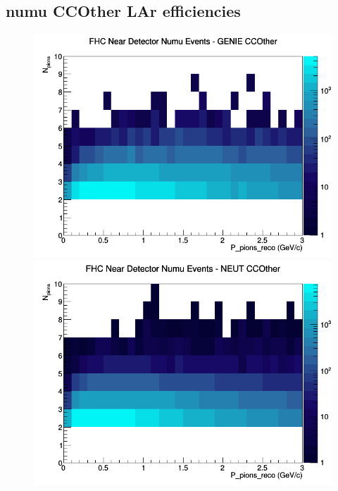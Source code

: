 \documentclass[12pt]{article}
\begin{document}
\subsection{numu CCOther LAr efficiencies}
\begin{figure}[h]
\includegraphics[width=\linewidth]{eff_N_P/LAr/pions/CCOther_FHC_ND_numu_N_P_GENIE.png}
\endminipage
{}
\includegraphics[width=\linewidth]{eff_N_P/LAr/pions/CCOther_FHC_ND_numu_N_P_NEUT.png}
\endminipage
{}

\end{figure}
\end{document}
